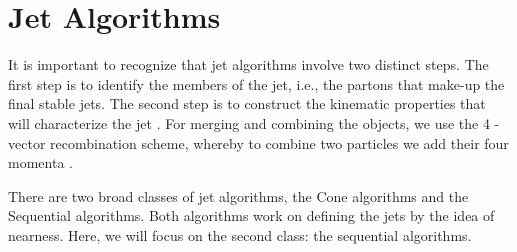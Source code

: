     

\section{Jet Algorithms}



It is important to recognize that jet algorithms involve two distinct steps. The first step is to identify the members of the jet, i.e., the partons that make-up the final stable jets. The second step is to construct the kinematic properties that will characterize the jet \citep{Berger:2002jt}. For merging and combining the objects, we use the 4 -vector recombination scheme, whereby to combine two particles we add their four momenta \citep{Blazey:2000qt}. 

There are two broad classes of jet algorithms, the Cone algorithms and the Sequential algorithms. Both algorithms work on defining the jets by the idea of nearness.
Here, we will focus on the second class:
the sequential algorithms.  

%
%
